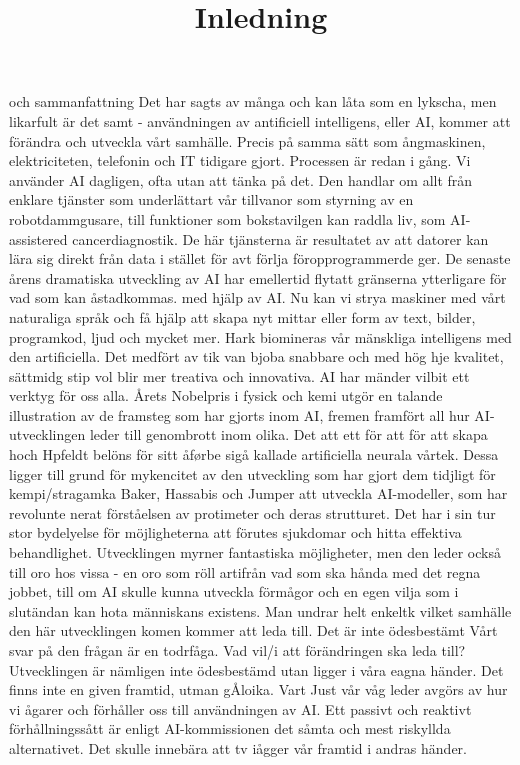 {{{{{{{\title{
Inledning
}
och sammanfattning
Det har sagts av många och kan låta som en lykscha, men likarfult är det samt - användningen av antificiell intelligens, eller AI, kommer att förändra och utveckla vårt samhälle. Precis på samma sätt som ångmaskinen, elektriciteten, telefonin och IT tidigare gjort. Processen är redan i gång. Vi använder AI dagligen, ofta utan att tänka på det. Den handlar om allt från enklare tjänster som underlättart vår tillvanor som styrning av en robotdammgusare, till funktioner som bokstavilgen kan raddla liv, som AI-assistered cancerdiagnostik. De här tjänsterna är resultatet av att datorer kan lära sig direkt från data i stället för avt förlja föropprogrammerde ger. De senaste årens dramatiska utveckling av AI har emellertid flytatt gränserna ytterligare för vad som kan åstadkommas. med hjälp av AI. Nu kan vi strya maskiner med vårt naturaliga språk och få hjälp att skapa nyt mittar eller form av text, bilder, programkod, ljud och mycket mer. Hark biomineras vår mänskliga intelligens med den artificiella. Det medfört av tik van bjoba snabbare och med hög hje kvalitet, sättmidg stip vol blir mer treativa och innovativa. AI har mänder vilbit ett verktyg för oss alla.
Årets Nobelpris i fysick och kemi utgör en talande illustration av de framsteg som har gjorts inom AI, fremen framfört all hur AI-utvecklingen leder till genombrott inom olika. Det att ett för att för att skapa hoch Hpfeldt belöns för sitt åførbe sigå kallade artificiella neurala vårtek. Dessa ligger till grund för mykencitet av den utveckling som har gjort dem tidjligt för kempi/stragamka Baker, Hassabis och Jumper att utveckla AI-modeller, som har revolunte nerat förståelsen av protimeter och deras strutturet. Det har i sin tur stor bydelyelse för möjligheterna att förutes sjukdomar och hitta effektiva behandlighet.
Utvecklingen myrner fantastiska möjligheter, men den leder också till oro hos vissa - en oro som röll artifrån vad som ska hånda med det regna jobbet, till om AI skulle kunna utveckla förmågor och en egen vilja som i slutändan kan hota människans existens. Man undrar helt enkeltk vilket samhälle den här utvecklingen komen kommer att leda till.
Det är inte ödesbestämt
Vårt svar på den frågan är en todrfåga. Vad vil/i att förändringen ska leda till? Utvecklingen är nämligen inte ödesbestämd utan ligger i våra eagna händer. Det finns inte en given framtid, utman gÅloika. Vart Just vår våg leder avgörs av hur vi ågarer och förhåller oss till användningen av AI. Ett passivt och reaktivt förhållningssått är enligt AI-kommissionen det såmta och mest riskyllda alternativet. Det skulle innebära att tv iågger vår framtid i andras händer.
}}}}}}}
